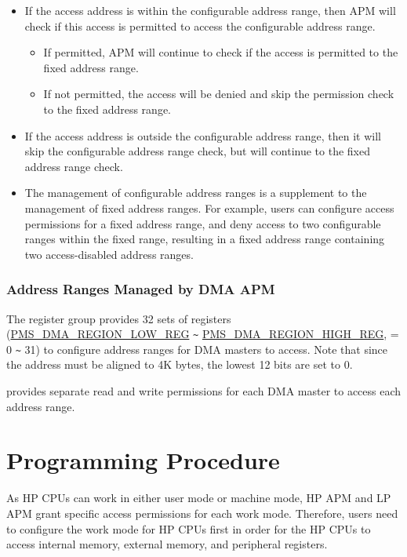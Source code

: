 \documentclass[main\_\_EN.tex]{subfiles}
\begin{document}
\begin{itemize}
    \item If the access address is within the configurable address range, then APM will check if this access is permitted to access the configurable address range.
    \begin{itemize}
        \item If permitted, APM will continue to check if the access is permitted to the fixed address range.
        \item If not permitted, the access will be denied and skip the permission check to the fixed address range.

    \end{itemize}
    \item If the access address is outside the configurable address range, then it will skip the configurable address range check, but will continue to the fixed address range check.

    \item The management of configurable address ranges is a supplement to the management of fixed address ranges. For example, users can configure access permissions for a fixed address range, and deny access to two configurable ranges within the fixed range, resulting in a fixed address range containing two access-disabled address ranges.
\end{itemize}


\subsubsection{Address Ranges Managed by DMA APM}

The register group  provides 32 sets of registers (\hyperref[fielddesc:PMSDMAREGIONNLOW]{PMS\_DMA\_REGION\_LOW\_REG} \verb+~+ \hyperref[fielddesc:PMSDMAREGIONNHIGH]{PMS\_DMA\_REGION\_HIGH\_REG},  = 0 \verb+~+ 31) to configure address ranges for DMA masters to access. Note that since the address must be aligned to 4K bytes, the lowest 12 bits are set to 0.

 provides separate read and write permissions for each DMA master to access each address range.

\section{Programming Procedure}

As HP CPUs can work in either user mode or machine mode, HP APM and LP APM grant specific access permissions for each work mode. Therefore, users need to configure the work mode for HP CPUs first in order for the HP CPUs to access internal memory, external memory, and peripheral registers.
\end{document}
